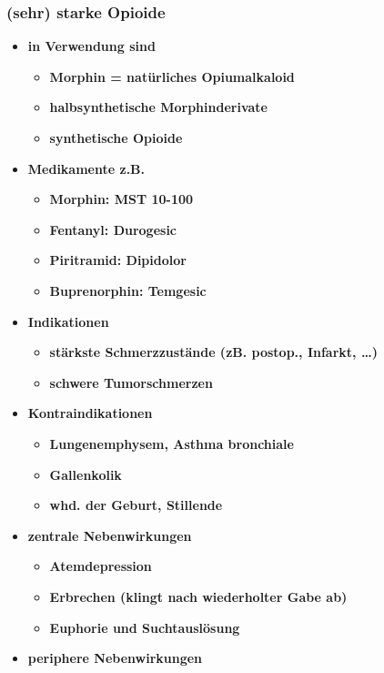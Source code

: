 \subsubsection{(sehr) starke Opioide}
	\begin{itemize}
		\item \textbf{in Verwendung sind}
			\begin{itemize}
				\item \textbf{Morphin = natürliches Opiumalkaloid}
				\item \textbf{halbsynthetische Morphinderivate}
				\item \textbf{synthetische Opioide}
			\end{itemize}
		\item \textbf{Medikamente z.B.}
			\begin{itemize}
				\item \textbf{Morphin: MST 10-100\textregistered}
				\item \textbf{Fentanyl:  Durogesic\textregistered}
				\item \textbf{Piritramid: Dipidolor\textregistered}
				\item \textbf{Buprenorphin: Temgesic\textregistered}
			\end{itemize}
		\item \textbf{Indikationen}
			\begin{itemize}
				\item \textbf{stärkste Schmerzzustände (zB. postop., Infarkt, …)}
				\item \textbf{schwere Tumorschmerzen}
			\end{itemize}
		\item \textbf{Kontraindikationen}
			\begin{itemize}
				\item \textbf{Lungenemphysem, Asthma bronchiale}
				\item \textbf{Gallenkolik}
				\item \textbf{whd. der Geburt, Stillende}
			\end{itemize}
		\item \textbf{zentrale Nebenwirkungen}
			\begin{itemize}
				\item \textbf{Atemdepression}
				\item \textbf{Erbrechen (klingt nach wiederholter Gabe ab)}
				\item \textbf{Euphorie und Suchtauslösung}
			\end{itemize}
	\pagebreak
		\item \textbf{periphere Nebenwirkungen}

\end{itemize}
